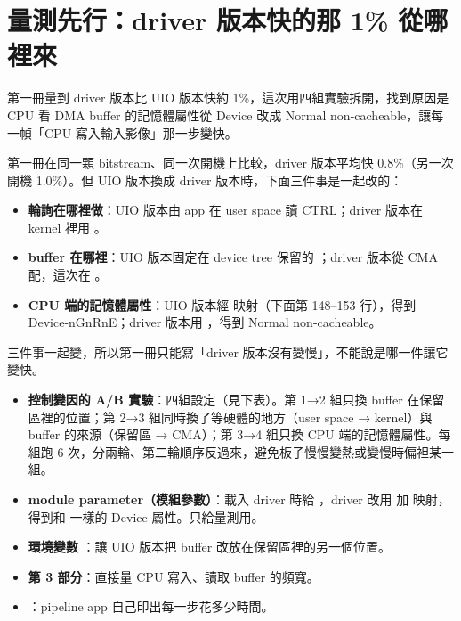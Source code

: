 \clearpage
\section{量測先行：driver 版本快的那 1\% 從哪裡來}
\label{sec:ab}

\begin{oneline}
第一冊量到 driver 版本比 UIO 版本快約 1\%，這次用四組實驗拆開，找到原因是 CPU 看 DMA buffer 的記憶體屬性從 Device 改成 Normal non-cacheable，讓每一幀「CPU 寫入輸入影像」那一步變快。
\end{oneline}

\begin{before}
第一冊在同一顆 bitstream、同一次開機上比較，driver 版本平均快 0.8\%（另一次開機 1.0\%）。但 UIO 版本換成 driver 版本時，下面三件事是一起改的：
\begin{itemize}
\item \textbf{輪詢在哪裡做}：UIO 版本由 app 在 user space 讀 CTRL；driver 版本在 kernel 裡用 。
\item \textbf{buffer 在哪裡}：UIO 版本固定在 device tree 保留的 ；driver 版本從 CMA 配，這次在 。
\item \textbf{CPU 端的記憶體屬性}：UIO 版本經  映射（下面第 148--153 行），得到 Device-nGnRnE；driver 版本用 ，得到 Normal non-cacheable。
\end{itemize}
三件事一起變，所以第一冊只能寫「driver 版本沒有變慢」，不能說是哪一件讓它變快。
\end{before}

\begin{tech}
\begin{itemize}
\item \textbf{控制變因的 A/B 實驗}：四組設定（見下表）。第 1→2 組只換 buffer 在保留區裡的位置；第 2→3 組同時換了等硬體的地方（user space → kernel）與 buffer 的來源（保留區 → CMA）；第 3→4 組只換 CPU 端的記憶體屬性。每組跑 6 次，分兩輪、第二輪順序反過來，避免板子慢慢變熱或變慢時偏袒某一組。
\item \textbf{module parameter（模組參數）}：載入 driver 時給 ，driver 改用  加  映射，得到和  一樣的 Device 屬性。只給量測用。
\item \textbf{環境變數 }：讓 UIO 版本把 buffer 改放在保留區裡的另一個位置。
\item \textbf{ 第 3 部分}：直接量 CPU 寫入、讀取 buffer 的頻寬。
\item \textbf{}：pipeline app 自己印出每一步花多少時間。
\end{itemize}
\end{tech}

